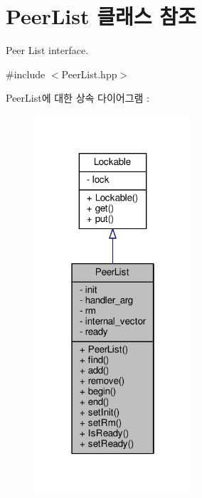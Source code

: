\hypertarget{class_peer_list}{}\section{Peer\+List 클래스 참조}
\label{class_peer_list}


Peer List interface.  




{\ttfamily \#include $<$Peer\+List.\+hpp$>$}



Peer\+List에 대한 상속 다이어그램 \+: 
\nopagebreak
\begin{figure}[H]
\begin{center}
\leavevmode
\includegraphics[width=166pt]{class_peer_list__inherit__graph}
\end{center}
\end{figure}


